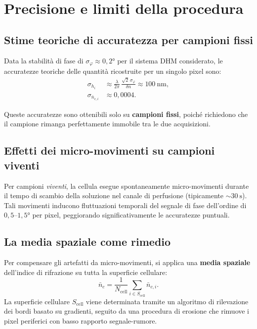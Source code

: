 \section{Precisione e limiti della procedura}

\subsection{Stime teoriche di accuratezza per campioni fissi}

Data la stabilità di fase di $\sigma_\varphi \approx 0{,}2°$ per il sistema DHM
considerato, le accuratezze teoriche delle quantità ricostruite per un singolo pixel
sono:
\begin{align*}
  \sigma_{h_i} &\approx \frac{\lambda}{2\pi}\,\frac{\sqrt{2}\,\sigma_\varphi}{\delta n}
               \approx 100\ \mathrm{nm}, \\[4pt]
  \sigma_{\bar{n}_{c,i}} &\approx 0{,}0004.
\end{align*}

Queste accuratezze sono ottenibili solo su \textbf{campioni fissi}, poiché
richiedono che il campione rimanga perfettamente immobile tra le due acquisizioni.

\subsection{Effetti dei micro-movimenti su campioni viventi}

Per campioni \emph{viventi}, la cellula esegue spontaneamente micro-movimenti
durante il tempo di scambio della soluzione nel canale di perfusione (tipicamente
$\sim 30\ \mathrm{s}$). Tali movimenti inducono fluttuazioni temporali del segnale
di fase dell'ordine di $0{,}5$--$1{,}5°$ per pixel, peggiorando significativamente
le accuratezze puntuali.

\subsection{La media spaziale come rimedio}

Per compensare gli artefatti da micro-movimenti, si applica una \textbf{media
spaziale} dell'indice di rifrazione su tutta la superficie cellulare:
\[
  \bar{n}_c = \frac{1}{N_\mathrm{cell}}\sum_{i \in S_\mathrm{cell}} \bar{n}_{c,i}.
\]
La superficie cellulare $S_\mathrm{cell}$ viene determinata tramite un algoritmo di
rilevazione dei bordi basato su gradienti, seguito da una procedura di erosione che
rimuove i pixel periferici con basso rapporto segnale-rumore.

